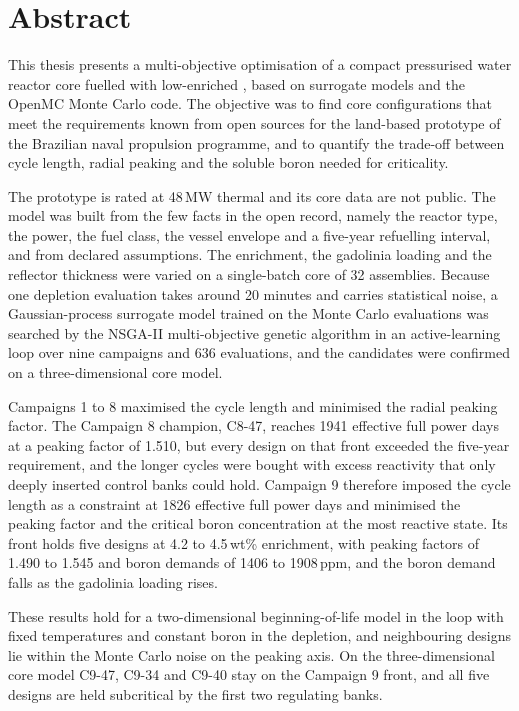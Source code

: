\chapter*{Abstract}
\thispagestyle{specialheader}
\markboth{}{}
This thesis presents a multi-objective optimisation of a compact
pressurised water reactor core fuelled with low-enriched , based
on surrogate models and the OpenMC Monte Carlo code. The objective was to find
core configurations that meet the requirements known from open sources
for the land-based prototype of the Brazilian naval propulsion
programme, and to quantify the trade-off
between cycle length, radial peaking and the soluble boron needed for
criticality.

The prototype is rated at 48\,MW thermal and its core data are not
public. The model was built from the few facts in the open record, namely
the reactor type, the power, the fuel class, the vessel envelope and a
five-year refuelling interval, and from declared assumptions. The enrichment, the gadolinia loading and the reflector
thickness were varied on a single-batch core of 32 assemblies. Because one
depletion evaluation takes around 20 minutes and carries statistical
noise, a Gaussian-process surrogate model trained on the Monte Carlo
evaluations was searched by the NSGA-II multi-objective genetic algorithm
in an active-learning loop over nine campaigns and
636 evaluations, and the candidates were confirmed on a
three-dimensional core model.

Campaigns 1 to 8 maximised the cycle length and minimised the radial
peaking factor. The Campaign 8 champion, C8-47, reaches 1941 effective
full power days at a peaking factor of 1.510, but every design on that
front exceeded the five-year requirement, and the longer cycles were
bought with excess reactivity that only deeply inserted control banks
could hold. Campaign 9 therefore imposed the cycle length as a
constraint at 1826 effective full power days and minimised the peaking
factor and the critical boron concentration at the most reactive state.
Its front holds five designs at 4.2 to 4.5\,wt\% enrichment, with peaking
factors of 1.490 to 1.545 and boron demands of 1406 to 1908\,ppm, and the
boron demand falls as the gadolinia loading rises.

These results hold for a two-dimensional beginning-of-life model in the
loop with fixed temperatures and constant boron in the depletion, and
neighbouring designs lie within the Monte Carlo noise on the peaking axis.
On the three-dimensional core model C9-47, C9-34 and C9-40 stay on the
Campaign 9 front, and all five designs are held subcritical by the first
two regulating banks.
